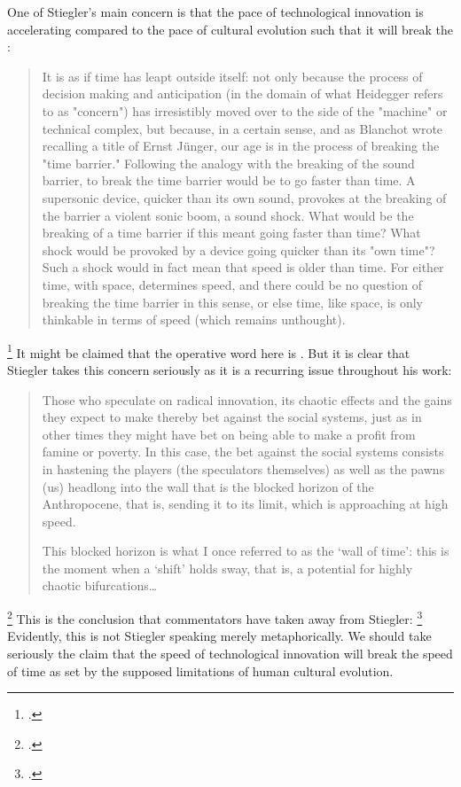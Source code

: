 \documentclass[letterpaper,notitlepage,12pt]{article}
\begin{document}
One of Stiegler's main concern is that the pace of technological innovation is
accelerating compared to the pace of cultural evolution such that it will break
the : \blockquote{It is as if time has leapt outside 
  itself: not only because the process of decision making and anticipation (in 
  the domain of what Heidegger refers to as "concern") has irresistibly moved 
  over to the side of the "machine" or technical complex, but because, in a 
  certain sense, and as Blanchot wrote recalling a title of Ernst J\"{u}nger, our 
  age is in the process of breaking the "time barrier." Following the analogy 
  with the breaking of the sound barrier, to break the time barrier would be to 
  go faster than time. A supersonic device, quicker than its own sound, provokes
  at the breaking of the barrier a violent sonic boom, a sound shock. What would 
  be the breaking of a time barrier if this meant going faster than time? What 
  shock would be provoked by a device going quicker than its "own time"? Such a 
  shock would in fact mean that speed is older than time. For either time, with 
  space, determines speed, and there could be no question of breaking the time 
  barrier in this sense, or else time, like space, is only thinkable in terms of
speed (which remains unthought).}\footcite[p. 15]{stiegler_technics_1998}
It might be claimed that the operative word here is .
But it is clear that Stiegler takes this concern seriously as it is a recurring
issue throughout his work: \blockquote{Those who speculate on radical 
  innovation, its chaotic effects and the gains they expect to make thereby bet 
  against the social systems, just as in other times they might have bet on 
  being able to make a profit from famine or poverty. In this case, the bet 
  against the social systems consists in hastening the players (the speculators 
  themselves) as well as the pawns (us) headlong into the wall that is the 
  blocked horizon of the Anthropocene, that is, sending it to its limit, which 
  is approaching at high speed. 

  This blocked horizon is what I once referred to as the ‘wall of time’: this is
  the moment when a ‘shift’ holds sway, that is, a potential for highly chaotic 
bifurcations\ldots}\footcite[ch. 5.26]{stiegler_age_2019}
This is the conclusion that commentators have taken away from
Stiegler: \footcite[p. 148]{bishop_building_2020}
Evidently, this is not Stiegler speaking merely metaphorically.
We should take seriously the claim that the speed of technological innovation
will break the speed of time as set by the supposed limitations of human
cultural evolution.
\end{document}
